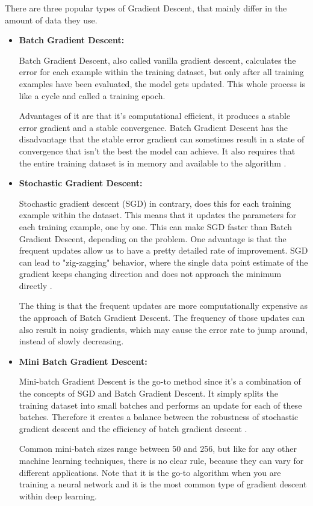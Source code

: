 There are three popular types of Gradient Descent, that mainly differ in the amount of data they use.
\begin{itemize}
	\item \textbf{Batch Gradient Descent:}
	
	Batch Gradient Descent, also called vanilla gradient descent, calculates the error for each example within the training dataset, but only after all training examples have been evaluated, the model gets updated. This whole process is like a cycle and called a training epoch.
	
	Advantages of it are that it’s computational efficient, it produces a stable error gradient and a stable convergence. Batch Gradient Descent has the disadvantage that the stable error gradient can sometimes result in a state of convergence that isn’t the best the model can achieve. It also requires that the entire training dataset is in memory and available to the algorithm \cite{goodfellow2016deep}.
	
	\item \textbf{Stochastic Gradient Descent:}
	
	Stochastic gradient descent (SGD) in contrary, does this for each training example within the dataset. This means that it updates the parameters for each training example, one by one. This can make SGD faster than Batch Gradient Descent, depending on the problem. One advantage is that the frequent updates allow us to have a pretty detailed rate of improvement. SGD can lead to "zig-zagging" behavior, where the single data point estimate of the gradient keeps changing direction and does not approach the minimum directly \cite{goodfellow2016deep}.
	
	The thing is that the frequent updates are more computationally expensive as the approach of Batch Gradient Descent. The frequency of those updates can also result in noisy gradients, which may cause the error rate to jump around, instead of slowly decreasing.
	
	\item \textbf{Mini Batch Gradient Descent:}	
	
	Mini-batch Gradient Descent is the go-to method since it’s a combination of the concepts of SGD and Batch Gradient Descent. It simply splits the training dataset into small batches and performs an update for each of these batches. Therefore it creates a balance between the robustness of stochastic gradient descent and the efficiency of batch gradient descent \cite{yang2016craft}.
	
	Common mini-batch sizes range between 50 and 256, but like for any other machine learning techniques, there is no clear rule, because they can vary for different applications. Note that it is the go-to algorithm when you are training a neural network and it is the most common type of gradient descent within deep learning.	
\end{itemize}

